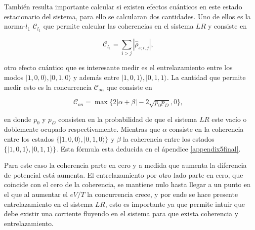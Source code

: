  También resulta importante calcular si existen efectos cuánticos en este estado estacionario del sistema, para ello se calcularan dos cantidades. Uno de ellos es la norma-$l_{1}$ $\mathcal{C}_{l_{1}}$ que permite calcular las coherencias en el sistema $LR$ y consiste en 

\begin{equation*}
    \mathcal{C}_{l_{1}} = \sum_{i> j} |\hat{\rho}_{s;i,j}|,
\end{equation*}

otro efecto cuántico que es interesante medir es el entrelazamiento entre los modos $|1,0,0\rangle,|0,1,0\rangle$ y además entre $|1,0,1\rangle,|0,1,1\rangle$. La cantidad que permite medir esto es la concurrencia $\mathcal{C}_{on}$ \cite{hill1997entanglement,wootters1998entanglement} que consiste en 

\begin{equation*}
    \mathcal{C}_{on} = \max \{ 2|\alpha+\beta| - 2\sqrt{p_{0}p_{D}},0 \},
\end{equation*}

en donde $p_{0}$ y $p_{D}$ consisten en la probabilidad de que el sistema $LR$ este vacío o doblemente ocupado respectivamente. Mientras que $\alpha$ consiste en la coherencia entre los estados $\{|1,0,0\rangle, |0,1,0\rangle \}$ y $\beta$ la coherencia entre los estados  $\{|1,0,1\rangle, |0,1,1\rangle\}$. Esta fórmula esta deducida en el ápendice \ref{appendix5final}. 

    
Para este caso la coherencia parte en cero y a medida que aumenta la diferencia de potencial está aumenta. El entrelazamiento por otro lado parte en cero, que coincide con el cero de la coherencia, se mantiene nulo hasta llegar a un punto en el que al aumentar el $eV/T$ la concurrencia crece, y por ende se hace presente entrelazamiento en el sistema $LR$, esto es importante ya que permite intuir que debe existir una corriente fluyendo en el sistema para que exista coherencia y entrelazamiento.

\label{sec5:transporte}

\newpage

